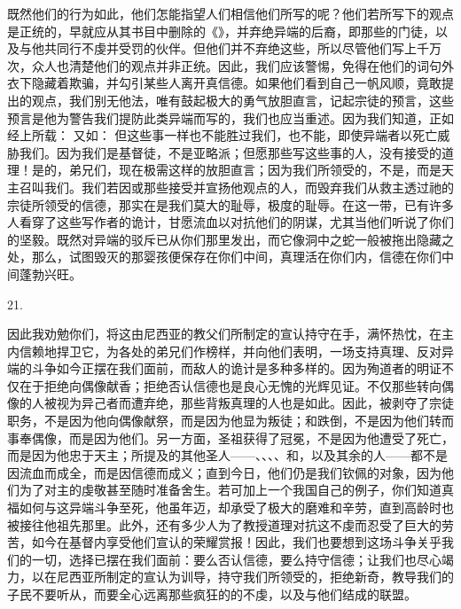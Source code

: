 既然他们的行为如此，他们怎能指望人们相信他们所写的呢？他们若所写下的观点是正统的，早就应从其书目中删除的《》，并弃绝异端的后裔，即那些的门徒，以及与他共同行不虔并受罚的伙伴。但他们并不弃绝这些，所以尽管他们写上千万次，众人也清楚他们的观点并非正统。因此，我们应该警惕，免得在他们的词句外衣下隐藏着欺骗，并勾引某些人离开真信德。如果他们看到自己一帆风顺，竟敢提出的观点，我们别无他法，唯有鼓起极大的勇气放胆直言，记起宗徒的预言，这些预言是他为警告我们提防此类异端而写的，我们也应当重述。因为我们知道，正如经上所载： 又如： 但这些事一样也不能胜过我们，也不能，即使异端者以死亡威胁我们。因为我们是基督徒，不是亚略派；但愿那些写这些事的人，没有接受的道理！是的，弟兄们，现在极需这样的放胆直言；因为我们所领受的，不是，而是天主召叫我们。我们若因或那些接受并宣扬他观点的人，而毁弃我们从救主透过祂的宗徒所领受的信德，那实在是我们莫大的耻辱，极度的耻辱。在这一带，已有许多人看穿了这些写作者的诡计，甘愿流血以对抗他们的阴谋，尤其当他们听说了你们的坚毅。既然对异端的驳斥已从你们那里发出，而它像洞中之蛇一般被拖出隐藏之处，那么，试图毁灭的那婴孩便保存在你们中间，真理活在你们内，信德在你们中间蓬勃兴旺。\par

21. \par

因此我劝勉你们，将这由尼西亚的教父们所制定的宣认持守在手，满怀热忱，在主内信赖地捍卫它，为各处的弟兄们作榜样，并向他们表明，一场支持真理、反对异端的斗争如今正摆在我们面前，而敌人的诡计是多种多样的。因为殉道者的明证不仅在于拒绝向偶像献香；拒绝否认信德也是良心无愧的光辉见证。不仅那些转向偶像的人被视为异己者而遭弃绝，那些背叛真理的人也是如此。因此，被剥夺了宗徒职务，不是因为他向偶像献祭，而是因为他显为叛徒；和跌倒，不是因为他们转而事奉偶像，而是因为他们。另一方面，圣祖获得了冠冕，不是因为他遭受了死亡，而是因为他忠于天主；所提及的其他圣人——、、、、和，以及其余的人——都不是因流血而成全，而是因信德而成义；直到今日，他们仍是我们钦佩的对象，因为他们为了对主的虔敬甚至随时准备舍生。若可加上一个我国自己的例子，你们知道真福如何与这异端斗争至死，他虽年迈，却承受了极大的磨难和辛劳，直到高龄时也被接往他祖先那里。此外，还有多少人为了教授道理对抗这不虔而忍受了巨大的劳苦，如今在基督内享受他们宣认的荣耀赏报！因此，我们也要想到这场斗争关乎我们的一切，选择已摆在我们面前：要么否认信德，要么持守信德；让我们也尽心竭力，以在尼西亚所制定的宣认为训导，持守我们所领受的，拒绝新奇，教导我们的子民不要听从，而要全心远离那些疯狂的的不虔，以及与他们结成的联盟。\par

